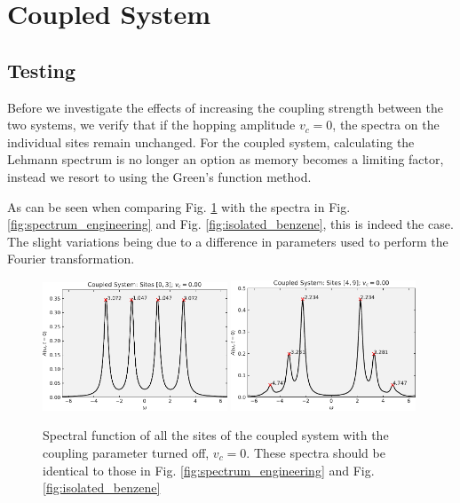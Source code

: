 \section{Coupled System}

\subsection{Testing}
Before we investigate the effects of increasing the coupling strength between the two systems, we verify that if the hopping amplitude $v_c = 0$, the spectra on the individual sites remain unchanged. For the coupled system, calculating the Lehmann spectrum is no longer an option as memory becomes a limiting factor, instead we resort to using the Green's function method.

\medskip
As can be seen when comparing Fig. \ref{fig:coupled_vc_0} with the spectra in Fig. \ref{fig:spectrum_engineering} and Fig. \ref{fig:isolated_benzene}, this is indeed the case. The slight variations being due to a difference in parameters used to perform the Fourier transformation.

\begin{figure}[!hbt]
    \centering
    \includegraphics[width=0.49\textwidth]{graph/coupled_QD_vc_0.pdf}
    \includegraphics[width=0.49\textwidth]{graph/coupled_benzene_vc_0.pdf}
    \caption{Spectral function of all the sites of the coupled system with the coupling parameter turned off, $v_c = 0$. These spectra should be identical to those in Fig. \ref{fig:spectrum_engineering} and Fig. \ref{fig:isolated_benzene}}
    \label{fig:coupled_vc_0}
\end{figure}

